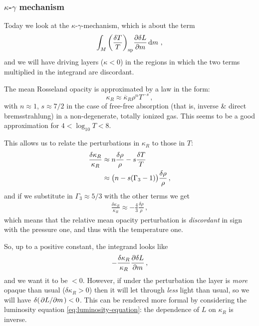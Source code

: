 \documentclass[main.tex]{subfiles}
\begin{document}
\subsubsection{\(\kappa \)-\(\gamma \) mechanism}

Today we look at the \(\kappa \)-\(\gamma \)-mechanism, which is about the term 
%
\begin{equation}
\int_M \qty(\frac{\delta T}{T})_{\text{sp}} \pdv{\delta L}{m} \dd{m} 
\,,
\end{equation}
%
and we will have driving layers (\(\kappa <0\)) in the regions in which the two terms multiplied in the integrand are discordant. 

The mean Rosseland opacity is approximated by a law in the form: 
%
\begin{equation}
  \kappa _R \approx \overline{\kappa }_R \rho^{n} T^{-s} 
\,,
\end{equation}
%
with \(n \approx 1\), \(s \approx 7/2\) in the case of free-free absorption (that is, inverse \& direct bremsstrahlung) in a non-degenerate, totally ionized gas.
This seems to be a good approximation for \(4 < \log_{10}T < 8\). 

This allows us to relate the perturbations in \(\kappa_{R} \) to those in \(T\): 
%
\begin{align}
\frac{ \delta \kappa_R}{ \kappa_R} &\approx
n \frac{ \delta \rho }{\rho } - s \frac{ \delta T}{T}  \\
&\approx \qty(n - s (\Gamma_3 -1)) \frac{ \delta \rho }{\rho }
\,,
\end{align}
%
and if we substitute in \(\Gamma_3 \approx 5/3\) with the other terms we get 
%
\begin{align}
\frac{ \delta \kappa_R}{\kappa _R} \approx - \frac{4}{3} \frac{ \delta \rho }{\rho }
\,,
\end{align}
%
which means that the relative mean opacity perturbation is \emph{discordant} in sign with the pressure one, and thus with the temperature one. 

So, up to a positive constant, the integrand looks like 
%
\begin{align}
-\frac{ \delta \kappa _R}{\kappa _R} \pdv{ \delta L}{m}
\,,
\end{align}
%
and we want it to be \(<0\). 
However, if under the perturbation the layer is \emph{more} opaque than usual (\(\delta \kappa _R > 0\)) then it will let through \emph{less} light than usual, so we will have \(\delta (\pdv*{L}{m}) < 0\).
This can be rendered more formal by considering the luminosity equation \eqref{eq:luminosity-equation}: the dependence of \(L\) on \(\kappa_R \) is inverse.
\end{document}
